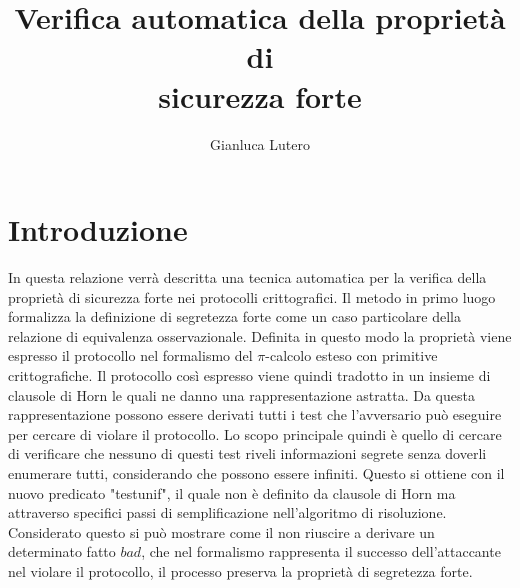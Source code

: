 \documentclass[12pt]{article}
\title{Verifica automatica della proprietà di\\ sicurezza forte}
\author{Gianluca Lutero}
\begin{document}
\maketitle

\vspace{1.5cm}
\section*{Introduzione}
In questa relazione verrà descritta una tecnica automatica per la verifica della proprietà di sicurezza forte nei protocolli crittografici. Il metodo in primo luogo formalizza la definizione di segretezza forte come un caso particolare della relazione di equivalenza osservazionale. Definita in questo modo la proprietà viene espresso il protocollo nel formalismo del $\pi$-calcolo esteso con primitive crittografiche. Il protocollo così espresso viene quindi tradotto in un insieme di clausole di Horn le quali ne danno una rappresentazione astratta. Da questa rappresentazione possono essere derivati tutti i test che l'avversario può eseguire per cercare di violare il protocollo. Lo scopo principale quindi è quello di cercare di verificare che nessuno di questi test riveli informazioni segrete senza doverli enumerare tutti, considerando che possono essere infiniti. Questo si ottiene con il nuovo predicato "testunif", il quale non è definito da clausole di Horn ma attraverso specifici passi di semplificazione nell'algoritmo di risoluzione. Considerato questo si può mostrare come il non riuscire a derivare un determinato fatto $bad$, che nel formalismo rappresenta il successo dell'attaccante nel violare il protocollo, il processo preserva la proprietà di segretezza forte.

\newpage
\end{document}
